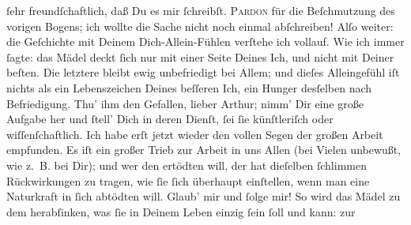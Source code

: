 \begin{ledgroupsized}[t]{13cm}
               ſehr freundſchaftlich, daß Du es mir ſchreibſt.\pend
           \pstart
           {\pb}\textsc{Pardon} für die Beſchmutzung des vorigen Bogens; ich wollte
               die Sache nicht noch einmal abſchreiben!\pend
           \pstart
           Alſo weiter: die Geſchichte mit Deinem Dich-Allein-Fühlen verſtehe ich vollauf. Wie
               ich immer ſagte: das Mädel deckt ſich nur mit einer Seite Deines Ich, und nicht
               mit Deiner beſten. Die letztere bleibt ewig unbefriedigt bei Allem; und dieſes
               Alleingefühl iſt nichts als ein Lebenszeichen Deines beſſeren Ich, ein Hunger
               desſelben nach Befriedigung. Thu’ ihm den Gefallen, lieber Arthur; nimm’ Dir eine
               große Aufgabe her und ſtell’ Dich in deren Dienſt, ſei ſie künſtleriſch oder
               wiſſenſchaftlich. Ich habe erſt jetzt wieder den vollen Segen der großen Arbeit
               empfunden. Es iſt ein großer Trieb zur {\pb}Arbeit in
               uns Allen (bei Vielen unbewußt, wie z. B. bei Dir); und wer den  ertödten will, der hat
               dieſelben ſchlimmen Rückwirkungen zu tragen, wie ſie ſich überhaupt einſtellen, wenn
               man eine Naturkraft in ſich abtödten will. Glaub’ mir und ſolge mir! So wird das Mädel zu dem
               herabſinken, was ſie in Deinem Leben einzig ſein ſoll und kann: zur \label{K_L02661-111v}
\end{ledgroupsized}
